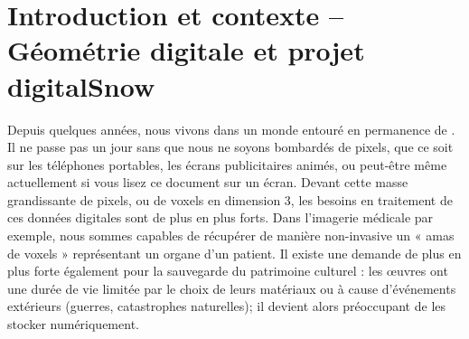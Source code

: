 %
%
%
\chapter{Introduction et contexte -- Géométrie digitale et projet digitalSnow}
\label{sec:introduction}


\setcounter{minitocdepth}{3}
\minitoc

\newpage

Depuis quelques années, nous vivons dans un monde entouré en permanence de
. Il ne passe pas un jour sans que nous ne soyons
bombardés de pixels, que ce soit sur les téléphones portables, les écrans
publicitaires animés, ou peut-être même actuellement si vous lisez ce document
sur un écran. Devant cette masse grandissante de pixels, ou de voxels en
dimension 3, les besoins en traitement de ces données digitales sont de plus en
plus forts. Dans l'imagerie médicale par exemple, nous sommes capables de
récupérer de manière non-invasive un « amas de voxels » représentant un organe
d'un patient. Il existe une demande de plus en plus forte également pour la
sauvegarde du patrimoine culturel : les œuvres ont une durée de vie limitée par
le choix de leurs matériaux ou à cause d’événements extérieurs (guerres,
catastrophes naturelles); il devient alors préoccupant de les stocker
numériquement.

